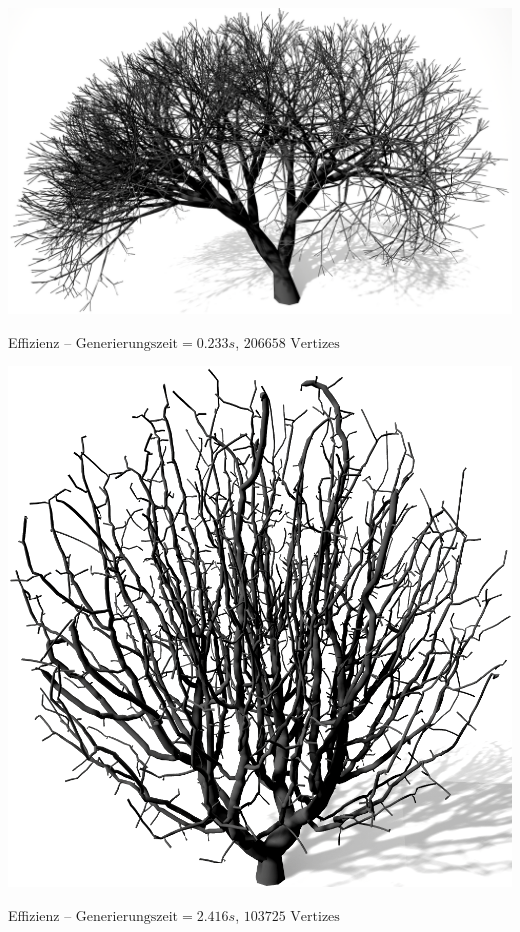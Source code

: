 \newpage
\begin{center}
	\includegraphics[height=.9\textheight]{images/Performance_LS_Ternary_4_Tropism}
	
	
	Effizienz --	$\text{Generierungszeit}= 0.233s$, $206658 \text{ Vertizes}$
\end{center}




\newpage
\begin{center}
	\includegraphics[height=.9\textheight]{images/Performance_SCA_Quali_Segments_High}
	
	Effizienz --	$\text{Generierungszeit} = 2.416s$, $103725 \text{ Vertizes}$
\end{center}






